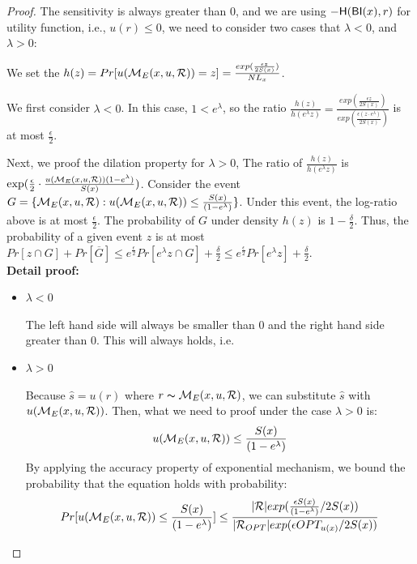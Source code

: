 \begin{proof}

The sensitivity is always greater than 0, and we are using $-\mathsf{H}(\mathsf{BI}(x),r)$ for utility function, i.e., $u(r) \leq 0$, we need to consider two cases that $\lambda < 0$, and $\lambda > 0$:

We set the $h(z) = Pr[u(\mathcal{M}_E(x, u, \mathcal{R})) = z] = \frac{exp(\frac{\epsilon z}{2 S(x)})}{NL_x}$.

We first consider $\lambda < 0$. In this case, $1 < e ^ {\lambda}$, so the ratio $\frac{h(z)}{h(e^{\lambda}z)} = \frac{exp(\frac{\epsilon z}{2 S(x)})}{exp(\frac{\epsilon (z \cdot e^{\lambda})}{2 S(x)})}$ is at most $\frac{\epsilon}{2}$.

Next, we proof the dilation property for $\lambda > 0$, The ratio of $\frac{h(z)}{h(e^{\lambda}z)}$ is $\exp(\frac{\epsilon}{2} \cdot \frac{u(\mathcal{M}_E(x, u, \mathcal{R})) (1 - e^{\lambda})}{S(x)})$. Consider the event $G = \{ \mathcal{M}_E(x, u, \mathcal{R}) : u(\mathcal{M}_E(x, u, \mathcal{R})) \leq \frac{S(x)}{(1 - e^{\lambda})}\}$. Under this event, the log-ratio above is at most $\frac{\epsilon}{2}$. The probability of $G$ under density $h(z)$ is $1 - \frac{\delta}{2}$. Thus, the probability of a given event $z$ is at most $Pr[z \cap G] + Pr[\overline{G}] \leq e^{\frac{\epsilon}{2}} Pr[e^{\lambda}z \cap G] + \frac{\delta}{2} \leq e^{\frac{\epsilon}{2}} Pr[e^{\lambda}z] + \frac{\delta}{2}$.\\


\textbf{Detail proof:}
\begin{itemize}

	\item $\lambda < 0$

		The left hand side will always be smaller than 0 and the right hand side greater than 0. This will always holds, i.e.
		\begin{equation*}
		\end{equation*}
	\item $\lambda > 0$


Because $\hat{s} = u(r)$ where $r \thicksim \mathcal{M}_E(x, u, \mathcal{R})$, we can substitute $\hat{s}$ with $u(\mathcal{M}_E(x, u, \mathcal{R}))$. Then, what we need to proof under the case $\lambda > 0$ is:
\begin{equation*}
u(\mathcal{M}_E(x, u, \mathcal{R})) \leq \frac{S(x)}{(1 - e ^ {\lambda})}
\end{equation*}
By applying the accuracy property of exponential mechanism, we bound the probability that the equation holds with probability:
\begin{equation*}
\begin{split}
Pr[u(\mathcal{M}_E(x, u, \mathcal{R})) \leq \frac{S(x)}{(1 - e ^ {\lambda})}] 
& \leq \frac{|\mathcal{R}|exp(\frac{\epsilon S(x)}{(1 - e ^ {\lambda})}/2 S(x))}{|\mathcal{R}_{OPT}| exp(\epsilon OPT_{u(x)}/2 S(x))}\\
\end{split}
\end{equation*}


\end{itemize}
\end{proof}
